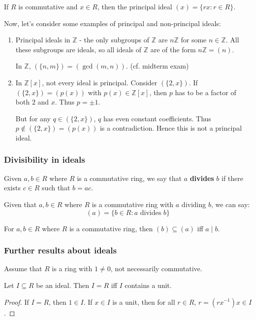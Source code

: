 \documentclass{article}
\theoremstyle{plain}
\newcommand{\Z}{\mathbb{Z}}
\begin{document}
\begin{corollary}{}{}
If $R$ is commutative and $x \in R$, then the principal ideal $(x) = \{ rx : r \in R \}$.
\end{corollary}
Now, let's consider some examples of principal  and non-principal ideals:
\begin{enumerate}[(1)]
\item Principal ideals in $\Z$ - the only subgroups of $\Z$ are $n\Z$ for some $n \in\Z$. All these subgroups are ideals, so all ideals of $\Z$ are of the form $n\Z = (n)$.

In $\Z$, $(\{n,m\}) = (\gcd(m,n))$. (cf. midterm exam)

\item In $\Z[x]$, not every ideal is principal. Consider $(\{2,x\})$. If $(\{2,x\}) = (p(x))$ with $p(x) \in \Z[x]$, then $p$ has to be a factor of both $2$ and $x$. Thus $p = \pm 1$.

But for any $q \in (\{2,x\})$, $q$ has even constant coefficients. Thus $p \not\in (\{2,x\}) = (p(x))$ is a contradiction. Hence this is not a principal ideal.
\end{enumerate}

\subsubsection{Divisibility in ideals}
\begin{definition}{}{}
Given $a,b \in R$ where $R$ is a commutative ring, we say that $a$ \textbf{divides} $b$ if there exists $c \in R$ such that $b = ac$.
\end{definition}
\begin{theorem}{}{}
Given that $a,b\in R$ where $R$ is a commutative ring with $a$ dividing $b$, we can say:
$$(a) = \{b \in R : a \text{ divides } b \}$$
\end{theorem}

\begin{theorem}{}{}
For $a,b \in R$ where $R$ is a commutative ring, then $(b) \subseteq (a)$ iff $a\mid b$.
\end{theorem}

\subsubsection{Further results about ideals}
Assume that $R$ is a ring with $1 \ne 0$, not necessarily commutative.
\begin{theorem}{}{}
Let $I \subseteq R$ be an ideal. Then $I = R$ iff $I$ contains a unit.
\end{theorem}
\begin{proof}
If $I = R$, then $1 \in I$. If $x \in I$ is a unit, then for all $r \in R$, $r = (rx^{-1})x \in I$.
\end{proof}
\end{document}
